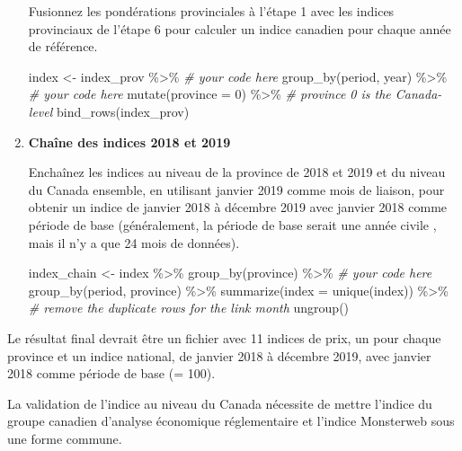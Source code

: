 \documentclass[
]{article}
\newenvironment{Shaded}{\begin{snugshade}}{\end{snugshade}}
\newcommand{\AttributeTok}[1]{\textcolor[rgb]{0.77,0.63,0.00}{#1}}
\newcommand{\CommentTok}[1]{\textcolor[rgb]{0.56,0.35,0.01}{\textit{#1}}}
\newcommand{\DecValTok}[1]{\textcolor[rgb]{0.00,0.00,0.81}{#1}}
\newcommand{\FunctionTok}[1]{\textcolor[rgb]{0.00,0.00,0.00}{#1}}
\newcommand{\NormalTok}[1]{#1}
\newcommand{\OtherTok}[1]{\textcolor[rgb]{0.56,0.35,0.01}{#1}}
\newcommand{\SpecialCharTok}[1]{\textcolor[rgb]{0.00,0.00,0.00}{#1}}
\begin{document}
\begin{enumerate}
  Fusionnez les pondérations provinciales à l'étape 1 avec les indices provinciaux de l'étape 6 pour calculer un indice canadien pour chaque année de référence.

\begin{Shaded}
\begin{Highlighting}[]
\NormalTok{index }\OtherTok{\textless{}{-}}\NormalTok{ index\_prov }\SpecialCharTok{\%\textgreater{}\%}
  \CommentTok{\# your code here}
  \FunctionTok{group\_by}\NormalTok{(period, year) }\SpecialCharTok{\%\textgreater{}\%}
  \CommentTok{\# your code here}
  \FunctionTok{mutate}\NormalTok{(}\AttributeTok{province =} \DecValTok{0}\NormalTok{) }\SpecialCharTok{\%\textgreater{}\%} \CommentTok{\# province 0 is the Canada{-}level}
  \FunctionTok{bind\_rows}\NormalTok{(index\_prov)}
\end{Highlighting}
\end{Shaded}
\item
  \textbf{Chaîne des indices 2018 et 2019}

  Enchaînez les indices au niveau de la province de 2018 et 2019 et du niveau du Canada ensemble, en utilisant janvier 2019 comme mois de liaison, pour obtenir un indice de janvier 2018 à décembre 2019 avec janvier 2018 comme période de base (généralement, la période de base serait une année civile , mais il n'y a que 24 mois de données).

\begin{Shaded}
\begin{Highlighting}[]
\NormalTok{index\_chain }\OtherTok{\textless{}{-}}\NormalTok{ index }\SpecialCharTok{\%\textgreater{}\%}
  \FunctionTok{group\_by}\NormalTok{(province) }\SpecialCharTok{\%\textgreater{}\%}
  \CommentTok{\# your code here}
  \FunctionTok{group\_by}\NormalTok{(period, province) }\SpecialCharTok{\%\textgreater{}\%}
  \FunctionTok{summarize}\NormalTok{(}\AttributeTok{index =} \FunctionTok{unique}\NormalTok{(index)) }\SpecialCharTok{\%\textgreater{}\%} \CommentTok{\# remove the duplicate rows for the link month}
  \FunctionTok{ungroup}\NormalTok{()}
\end{Highlighting}
\end{Shaded}
\end{enumerate}

Le résultat final devrait être un fichier avec 11 indices de prix, un pour chaque province et un indice national, de janvier 2018 à décembre 2019, avec janvier 2018 comme période de base (= 100).

La validation de l'indice au niveau du Canada nécessite de mettre l'indice du groupe canadien d'analyse économique réglementaire et l'indice Monsterweb sous une forme commune.
\end{document}
